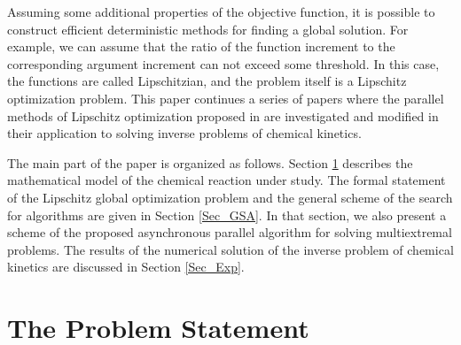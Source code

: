 \documentclass{svproc}
\begin{document}

Assuming some additional properties of the objective function, it is possible to construct efficient deterministic methods for finding a global solution. For example, we can assume that the ratio of the function increment to the corresponding argument increment can not exceed some threshold. In this case, the functions are called Lipschitzian, and the problem itself is a Lipschitz optimization problem.
This paper continues a series of papers where the parallel methods of Lipschitz optimization proposed in \cite{Strongin2000} are investigated and modified in their application to solving inverse problems of chemical kinetics.

The main part of the paper is organized as follows. Section \ref{Sec_math_mod} describes the mathematical model of the chemical reaction under study. The formal statement of the Lipschitz global optimization problem and the general scheme of the search for algorithms are given in Section \ref{Sec_GSA}. In that section, we also present a scheme of the proposed asynchronous parallel algorithm for solving multiextremal problems. The results of the numerical solution of the inverse problem of chemical kinetics are discussed in Section \ref{Sec_Exp}.

\section{The Problem Statement} \label{Sec_math_mod}
\end{document}
